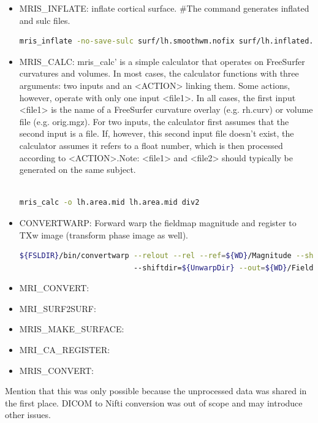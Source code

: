 \documentclass{article}
\begin{document}
\begin{itemize}
\item MRIS\_INFLATE: inflate cortical surface.
\#The command generates inflated and sulc files.
    \begin{lstlisting}[language=bash, basicstyle=\tiny]
mris_inflate -no-save-sulc surf/lh.smoothwm.nofix surf/lh.inflated.nofix
    \end{lstlisting}

\item MRIS\_CALC: mris\_calc' is a simple calculator that operates on
FreeSurfer curvatures and volumes. In most cases, the calculator functions
with three arguments: two inputs and an <ACTION> linking them.
Some actions, however, operate with only one input <file1>.
In all cases, the first input <file1> is the name of a FreeSurfer curvature overlay (e.g. rh.curv)
or volume file (e.g. orig.mgz). For two inputs, the calculator first assumes
that the second input is a file. If, however, this second input file doesn't exist,
the calculator assumes it refers to a float number, which is then processed according to <ACTION>.Note:
<file1> and <file2> should typically be generated on the same subject.
    \begin{lstlisting}[language=bash, basicstyle=\tiny]

mris_calc -o lh.area.mid lh.area.mid div2
    \end{lstlisting}

\item CONVERTWARP: Forward warp the fieldmap magnitude and register to TXw image (transform phase image as well).
    \begin{lstlisting}[language=bash, basicstyle=\tiny]
${FSLDIR}/bin/convertwarp --relout --rel --ref=${WD}/Magnitude --shiftmap=${WD}/FieldMap_ShiftMap${TXw}.nii.gz 
                          --shiftdir=${UnwarpDir} --out=${WD}/FieldMap_Warp${TXw}.nii.gz
    \end{lstlisting}
\item MRI\_CONVERT:

\item MRI\_SURF2SURF:

\item MRIS\_MAKE\_SURFACE:

\item MRI\_CA\_REGISTER:

\item MRIS\_CONVERT:

\end{itemize}

Mention that this was only possible because the unprocessed data was shared in the first place.
DICOM to Nifti conversion was out of scope and may introduce other issues.
\end{document}
